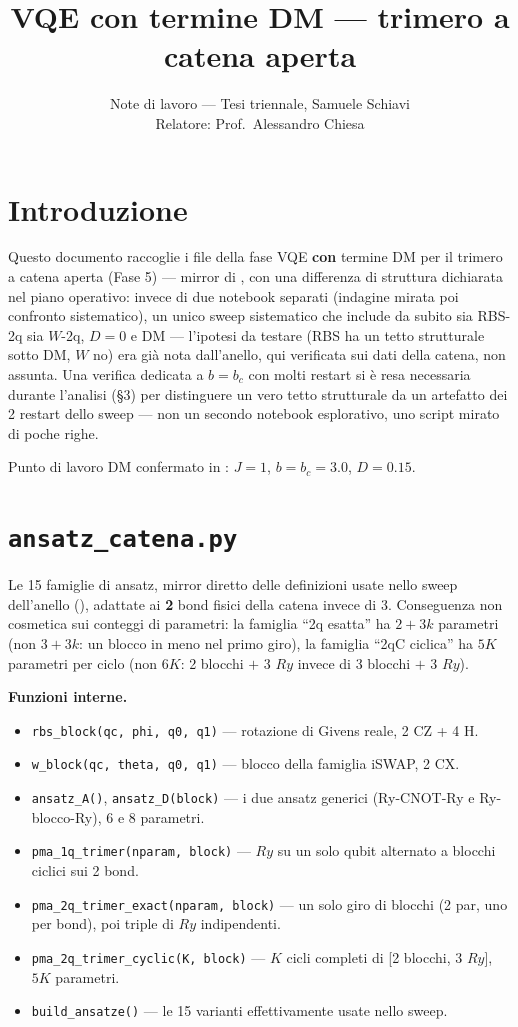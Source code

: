 \documentclass[11pt,a4paper]{article}
\title{VQE con termine DM — trimero a catena aperta}
\author{Note di lavoro — Tesi triennale, Samuele Schiavi\\ \small Relatore: Prof.\ Alessandro Chiesa}
\date{}
\begin{document}
\maketitle

\section*{Introduzione}

Questo documento raccoglie i file della fase VQE \textbf{con} termine DM per il
trimero a catena aperta (Fase 5) — mirror di \texttt{},
con una differenza di struttura dichiarata nel piano operativo: invece di due
notebook separati (indagine mirata poi confronto sistematico), un unico sweep
sistematico che include da subito sia RBS-2q sia $W$-2q, $D=0$ e DM — l'ipotesi da
testare (RBS ha un tetto strutturale sotto DM, $W$ no) era già nota dall'anello, qui
verificata sui dati della catena, non assunta. Una verifica dedicata a
$b=b_c$ con molti restart si è resa necessaria durante l'analisi (§3) per
distinguere un vero tetto strutturale da un artefatto dei 2 restart dello sweep —
non un secondo notebook esplorativo, uno script mirato di poche righe.

Punto di lavoro DM confermato in \texttt{}:
$J=1$, $b=b_c=3.0$, $D=0.15$.

\section*{\texttt{ansatz\_catena.py}}

Le 15 famiglie di ansatz, mirror diretto delle definizioni usate nello sweep
dell'anello (\texttt{}),
adattate ai \textbf{2} bond fisici della catena invece di 3. Conseguenza non
cosmetica sui conteggi di parametri: la famiglia ``2q esatta'' ha $2+3k$ parametri
(non $3+3k$: un blocco in meno nel primo giro), la famiglia ``2qC ciclica'' ha $5K$
parametri per ciclo (non $6K$: 2 blocchi $+$ 3 $Ry$ invece di 3 blocchi $+$ 3 $Ry$).

\textbf{Funzioni interne.}
\begin{itemize}
\item \texttt{rbs\_block(qc,\ phi,\ q0,\ q1)} — rotazione di Givens reale, 2 CZ + 4 H.
\item \texttt{w\_block(qc,\ theta,\ q0,\ q1)} — blocco della famiglia iSWAP, 2 CX.
\item \texttt{ansatz\_A()}, \texttt{ansatz\_D(block)} — i due ansatz generici
(Ry-CNOT-Ry e Ry-blocco-Ry), 6 e 8 parametri.
\item \texttt{pma\_1q\_trimer(nparam,\ block)} — $Ry$ su un solo qubit alternato a
blocchi ciclici sui 2 bond.
\item \texttt{pma\_2q\_trimer\_exact(nparam,\ block)} — un solo giro di blocchi (2
par, uno per bond), poi triple di $Ry$ indipendenti.
\item \texttt{pma\_2q\_trimer\_cyclic(K,\ block)} — $K$ cicli completi di [2 blocchi,
3 $Ry$], $5K$ parametri.
\item \texttt{build\_ansatze()} — le 15 varianti effettivamente usate nello sweep.
\end{itemize}
\end{document}
